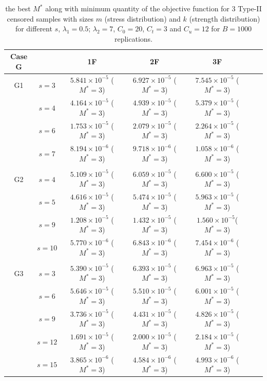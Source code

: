 \documentclass[twoside]{article}
\begin{document}
\begin{table}[h]\tiny
\caption{ the  best $M^*$  along with minimum quantity of the objective function for   $3$    Type-II  censored samples with sizes $m$ (stress distribution) and $k$   (strength distribution) for different  $s$, $\lambda_1=0.5$; $\lambda_2=7$,  $C_0=20$, $C_t=3$ and  $C_u=12$ for $B=1000$ replications.}\label{Tab3}
\centering
\begin{tabular}{ccccccc}\hline\hline
Case G&&1F&2F&3F&\\
\hline\hline
G1&$s=3$ & $5.841 \times 10^{-5}$ ($M^*=3$) &$6.927 \times10^{-5}$ ($M^*=3$)& $7.545 \times 10^{-5}$ ($M^*=3$)\\
&$s=4$ &$4.164 \times 10^{-5}$ ($M^*=3$) &$4.939 \times 10^{-5}$ ($M^*=3$)&$5.379  \times 10^{-5}$ ($M^*=3$)\\
&$s=6$&$1.753 \times 10^{-5}$ ($M^*=3$)&$2.079 \times 10^{-5}$ ($M^*=3$)&$2.264 \times 10^{-5}$ ($M^*=3$)\\
&$s=7$ &$8.194 \times 10^{-6}$ ($M^*=3$) &$9.718 \times 10^{-6}$ ($M^*=3$)&$1.058 \times 10^{-6}$ ($M^*=3$)\\
&&&&&&\\ \hline\hline
G2 &$s=4$ &$ 5.109 \times 10^{-5}$ ($M^*=3$) &$6.059 \times 10^{-5}$ ($M^*=3$)& $6.600 \times 10^{-5}$ ($M^*=3$)\\
&$s=5$ &$4.616 \times 10^{-5}$ ($M^*=3$) &$5.474 \times 10^{-5}$ ($M^*=3$)&$5.963 \times  10^{-5}$ ($M^*=3$)\\
&$s=9$&$1.208 \times 10^{-5}$ ($M^*=3$) &$1.432\times 10^{-5}$ ($M^*=3$)&$1.560 \times 10^{-5}$($M^*=3$)\\
&$s=10$ &$5.770 \times 10^{-6}$ ($M^*=3$) &$6.843 \times 10^{-6}$ ($M^*=3$)&$7.454 \times 10^{-6}$ ($M^*=3$)\\
&&&&&&\\ \hline\hline
G3 &$s=3$ &  $5.390  \times 10^{-5}$ ($M^*=3$) &$6.393\times 10^{-5}$ ($M^*=3$)& $6.963 \times 10^{-5}$ ($M^*=3$)\\
&$s=6$ & $5.646 \times 10^{-5}$ ($M^*=3$) &$5.510 \times 10^{-5}$ ($M^*=3$)&$6.001 \times  10^{-5}$ ($M^*=3$)\\
&$s=9$&$3.736 \times  10^{-5}$ ($M^*=3$) &$4.431 \times  10^{-5}$ ($M^*=3$)&$4.826 \times  10^{-5}$ ($M^*=3$)\\
&$s=12$ &$1.691 \times  10^{-5}$ ($M^*=3$) &$2.000 \times  10^{-5}$ ($M^*=3$)&$2.184 \times 10^{-5}$ ($M^*=3$)\\
&$s=15$ &$3.865 \times  10^{-6}$ ($M^*=3$) &$4.584 \times  10^{-6}$ ($M^*=3$)&$4.993 \times  10^{-6}$ ($M^*=3$)\\
\hline\hline
\end{tabular}
\end{table}
\end{document}

